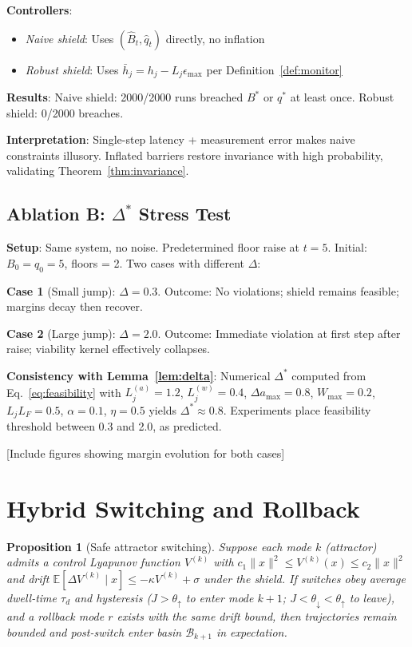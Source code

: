 \documentclass[11pt,a4paper]{article}
\newtheorem{proposition}{Proposition}
\begin{document}
\textbf{Controllers}:
\begin{itemize}
\item \emph{Naive shield}: Uses $(\hat{B}_t, \hat{q}_t)$ directly, no inflation
\item \emph{Robust shield}: Uses $\bar{h}_j = h_j - L_j \epsilon_{\max}$ per Definition~\ref{def:monitor}
\end{itemize}

\textbf{Results}: Naive shield: 2000/2000 runs breached $B^*$ or $q^*$ at least once. Robust shield: 0/2000 breaches.

\textbf{Interpretation}: Single-step latency + measurement error makes naive constraints illusory. Inflated barriers restore invariance with high probability, validating Theorem~\ref{thm:invariance}.

\subsection{Ablation B: $\Delta^*$ Stress Test}

\textbf{Setup}: Same system, no noise. Predetermined floor raise at $t=5$. Initial: $B_0 = q_0 = 5$, floors = 2. Two cases with different $\Delta$:

\textbf{Case 1} (Small jump): $\Delta = 0.3$. Outcome: No violations; shield remains feasible; margins decay then recover.

\textbf{Case 2} (Large jump): $\Delta = 2.0$. Outcome: Immediate violation at first step after raise; viability kernel effectively collapses.

\textbf{Consistency with Lemma~\ref{lem:delta}}: Numerical $\Delta^*$ computed from Eq.~\eqref{eq:feasibility} with $L_j^{(a)} = 1.2$, $L_j^{(w)} = 0.4$, $\Delta a_{\max} = 0.8$, $W_{\max} = 0.2$, $L_j L_F = 0.5$, $\alpha = 0.1$, $\eta = 0.5$ yields $\Delta^* \approx 0.8$. Experiments place feasibility threshold between 0.3 and 2.0, as predicted.

[Include figures showing margin evolution for both cases]

\section{Hybrid Switching and Rollback}

\begin{proposition}[Safe attractor switching]
\label{prop:switching}
Suppose each mode $k$ (attractor) admits a control Lyapunov function $V^{(k)}$ with $c_1 \|x\|^2 \leq V^{(k)}(x) \leq c_2 \|x\|^2$ and drift $\mathbb{E}[\Delta V^{(k)} \mid x] \leq -\kappa V^{(k)} + \sigma$ under the shield. If switches obey average dwell-time $\tau_d$ and hysteresis ($J > \theta_{\uparrow}$ to enter mode $k+1$; $J < \theta_{\downarrow} < \theta_{\uparrow}$ to leave), and a rollback mode $r$ exists with the same drift bound, then trajectories remain bounded and post-switch enter basin $\mathcal{B}_{k+1}$ in expectation.
\end{proposition}
\end{document}

